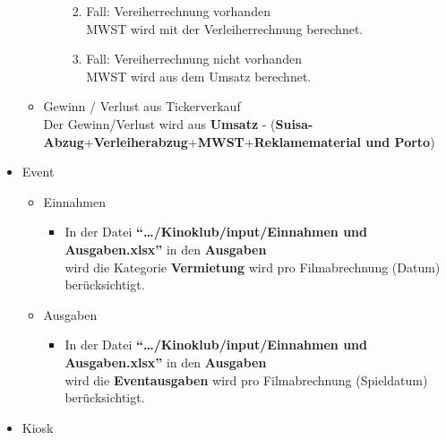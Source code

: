 \documentclass[
]{article}
\providecommand{\tightlist}{%
  \setlength{\itemsep}{0pt}\setlength{\parskip}{0pt}}
\begin{document}
\begin{itemize}
\begin{itemize}
\begin{itemize}
      \begin{enumerate}
      \def\labelenumi{\arabic{enumi}.}
      \tightlist
      \item
        Fall: Vereiherrechnung vorhanden\\
        MWST wird mit der Verleiherrechnung berechnet.
      \item
        Fall: Vereiherrechnung nicht vorhanden\\
        MWST wird aus dem Umsatz berechnet.
      \end{enumerate}
    \end{itemize}
  \item
    Gewinn / Verlust aus Tickerverkauf\\
    Der Gewinn/Verlust wird aus \textbf{Umsatz} -
    (\textbf{Suisa-Abzug}+\textbf{Verleiherabzug}+\textbf{MWST}+\textbf{Reklamematerial
    und Porto})
  \end{itemize}
\item
  Event

  \begin{itemize}
  \tightlist
  \item
    Einnahmen

    \begin{itemize}
    \tightlist
    \item
      In der Datei \textbf{``\ldots/Kinoklub/input/Einnahmen und
      Ausgaben.xlsx''} in den \textbf{Ausgaben}\\
      wird die Kategorie \textbf{Vermietung} wird pro Filmabrechnung
      (Datum) berücksichtigt.
    \end{itemize}
  \item
    Ausgaben

    \begin{itemize}
    \tightlist
    \item
      In der Datei \textbf{``\ldots/Kinoklub/input/Einnahmen und
      Ausgaben.xlsx''} in den \textbf{Ausgaben}\\
      wird die \textbf{Eventausgaben} wird pro Filmabrechnung
      (Spieldatum) berücksichtigt.
    \end{itemize}
  \end{itemize}
\item
  Kiosk


\end{itemize}
\end{document}
